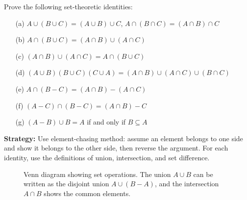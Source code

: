 \begin{problembox}
\begin{problemstatement}
Prove the following set-theoretic identities:
\begin{itemize}
\item[(a)] \( A \cup (B \cup C) = (A \cup B) \cup C \), \quad \( A \cap (B \cap C) = (A \cap B) \cap C \)
\item[(b)] \( A \cap (B \cup C) = (A \cap B) \cup (A \cap C) \)
\item[(c)] \( (A \cap B) \cup (A \cap C) = A \cap (B \cup C) \)
\item[(d)] \( (A \cup B)(B \cup C)(C \cup A) = (A \cap B) \cup (A \cap C) \cup (B \cap C) \)
\item[(e)] \( A \cap (B - C) = (A \cap B) - (A \cap C) \)
\item[(f)] \( (A - C) \cap (B - C) = (A \cap B) - C \)
\item[(g)] \( (A - B) \cup B = A \) if and only if \( B \subseteq A \)
\end{itemize}
\end{problemstatement}
\end{problembox}

\noindent\textbf{Strategy:} Use element-chasing method: assume an element belongs to one side and show it belongs to the other side, then reverse the argument. For each identity, use the definitions of union, intersection, and set difference.

\begin{figure}[h]
\centering
{}
\caption{Venn diagram showing set operations. The union $A \cup B$ can be written as the disjoint union $A \cup (B - A)$, and the intersection $A \cap B$ shows the common elements.}
\end{figure}

